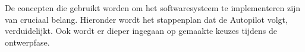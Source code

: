 \\
\\
\noindent
De concepten die gebruikt worden om het softwaresysteem te implementeren zijn van cruciaal belang. Hieronder wordt het stappenplan dat de Autopilot volgt, verduidelijkt. Ook wordt er dieper ingegaan op gemaakte keuzes tijdens de ontwerpfase. 


